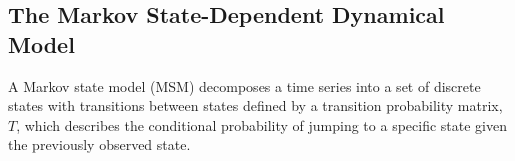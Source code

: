 \documentclass[12pt]{article}
\begin{document}



  \subsection{The Markov State-Dependent Dynamical Model}\label{method:MSMs}  

  A Markov state model (MSM) decomposes a time series into a set of discrete states
  with transitions between states defined by a transition probability matrix, $T$,
  which describes the conditional probability of jumping to a specific state given
  the previously observed state.~\cite{pande_everything_2010,wehmeyer_introduction_2018}
\end{document}
